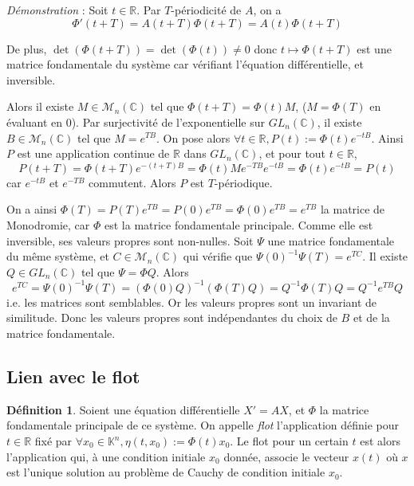 \documentclass[12pt]{article}
\theoremstyle{definition}
\newtheorem*{definition}{Définition}
\theoremstyle{definition}
\begin{document}
	\textit{Démonstration} : Soit $t \in \mathbb{R}$. Par $T$-périodicité de $A$, on a 
	\begin{equation}
		\Phi'(t+T) = A(t+T)\Phi(t+T) = A(t)\Phi(t+T)
	\end{equation}
	
	De plus, $\det(\Phi(t+T)) = \det(\Phi(t)) \neq 0$ donc $t\mapsto\Phi(t+T)$ est une matrice fondamentale du système car vérifiant l'équation différentielle, et inversible.
	
	Alors il existe $M \in \mathcal{M}_n(\mathbb{C})$ tel que $\Phi(t+T) = \Phi(t)M$, ($M = \Phi(T)$ en évaluant en $0$). Par surjectivité de l'exponentielle sur $GL_n(\mathbb{C})$, il existe $B \in \mathcal{M}_n(\mathbb{C})$ tel que $M = e^{TB}$. On pose alors $\forall t \in \mathbb{R}, P(t) := \Phi(t)e^{-tB}$. Ainsi $P$ est une application continue de $\mathbb{R}$ dans $GL_n(\mathbb{C})$, et pour tout $t \in \mathbb{R}$,
	\begin{equation}
		P(t+T) = \Phi(t+T)e^{-(t+T)B} = \Phi(t)Me^{-TB}e^{-tB} = \Phi(t)e^{-tB} = P(t)
	\end{equation}
	car $e^{-tB}$ et $e^{-TB}$ commutent. Alors $P$ est $T$-périodique.
	
	On a ainsi $\Phi(T) = P(T)e^{TB} = P(0)e^{TB} = \Phi(0)e^{TB} = e^{TB}$ la matrice de Monodromie, car $\Phi$ est la matrice fondamentale principale. Comme elle est inversible, ses valeurs propres sont non-nulles. Soit $\Psi$ une matrice fondamentale du même système, et $C \in \mathcal{M}_n(\mathbb{C})$ qui vérifie que $\Psi(0)^{-1}\Psi(T) = e^{TC}$. Il existe $Q \in GL_n(\mathbb{C})$ tel que $\Psi = \Phi Q$. Alors
	\begin{equation}
		e^{TC} = \Psi(0)^{-1}\Psi(T) = (\Phi(0)Q)^{-1}(\Phi(T)Q) = Q^{-1}\Phi(T)Q = Q^{-1}e^{TB}Q
	\end{equation}
	i.e. les matrices sont semblables. Or les valeurs propres sont un invariant de similitude. Donc les valeurs propres sont indépendantes du choix de $B$ et de la matrice fondamentale.
	
	
	\subsection{Lien avec le flot}
	
	\begin{definition}
		Soient une équation différentielle $X' = AX$, et $\Phi$ la matrice fondamentale principale de ce système. On appelle \textit{flot} l'application définie pour $t \in \mathbb{R}$ fixé par $\forall x_0 \in \mathbb{K}^n, \eta(t,x_0) := \Phi(t)x_0$. Le flot pour un certain $t$ est alors l'application qui, à une condition initiale $x_0$ donnée, associe le vecteur $x(t)$ où $x$ est l'unique solution au problème de Cauchy de condition initiale $x_0$.
	\end{definition}
	
\end{document}
